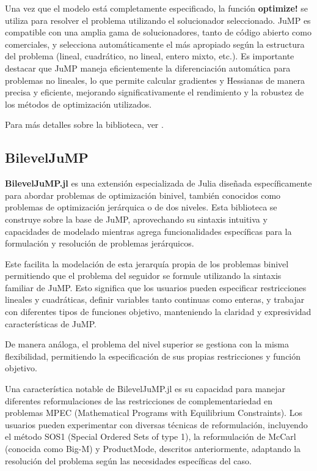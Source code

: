 Una vez que el modelo está completamente especificado, la función \textbf{optimize!} se utiliza para resolver el problema utilizando el solucionador seleccionado. JuMP es compatible con una amplia gama de solucionadores, tanto de código abierto como comerciales, y selecciona automáticamente el más apropiado según la estructura del problema (lineal, cuadrático, no lineal, entero mixto, etc.). Es importante destacar que JuMP maneja eficientemente la diferenciación automática para problemas no lineales, lo que permite calcular gradientes y Hessianas de manera precisa y eficiente, mejorando significativamente el rendimiento y la robustez de los métodos de optimización utilizados.

Para m\'as detalles sobre la biblioteca, ver \cite{JuMPPaper}.
\subsection*{BilevelJuMP}
\textbf{BilevelJuMP.jl} es una extensión especializada de Julia diseñada específicamente para abordar problemas de optimización binivel, también conocidos como problemas de optimización jerárquica o de dos niveles. Esta biblioteca se construye sobre la base de JuMP, aprovechando su sintaxis intuitiva y capacidades de modelado mientras agrega funcionalidades específicas para la formulación y resolución de problemas jerárquicos.

Este facilita la modelación de esta jerarquía propia de los problemas binivel permitiendo que el problema del seguidor se formule utilizando la sintaxis familiar de JuMP. Esto significa que los usuarios pueden especificar restricciones lineales y cuadráticas, definir variables tanto continuas como enteras, y trabajar con diferentes tipos de funciones objetivo, manteniendo la claridad y expresividad características de JuMP. 

De manera análoga, el problema del nivel superior se gestiona con la misma flexibilidad, permitiendo la especificación de sus propias restricciones y función objetivo.

Una característica notable de BilevelJuMP.jl es su capacidad para manejar diferentes reformulaciones de las restricciones de complementariedad en problemas MPEC (Mathematical Programs with Equilibrium Constraints). Los usuarios pueden experimentar con diversas técnicas de reformulación, incluyendo el método SOS1 (Special Ordered Sets of type 1), la reformulación de McCarl (conocida como Big-M) y ProductMode, descritos anteriormente, adaptando la resolución del problema según las necesidades específicas del caso.

